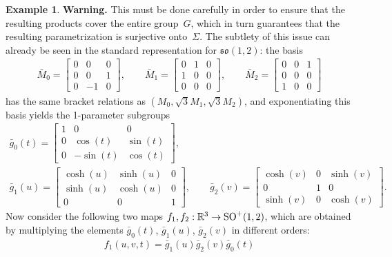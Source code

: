\documentclass[10pt,a4paper]{amsart}
\numberwithin{equation}{section}
\theoremstyle{definition}
\newtheorem{exmpl}[teo]{Example}
\begin{document}
\begin{exmpl}
{\bf Warning.} This must be done carefully in order to ensure that the resulting products cover the entire group~$G$,
which in turn guarantees that the resulting parametrization is surjective onto~$\Sigma$.
The subtlety of this issue can already be seen in the standard representation for $\mathfrak{so}(1,2)$: the basis
\begin{gather*}
\bar{M}_0 =
\begin{bmatrix}
0 & 0 & 0
\\
0 & 0 & 1
\\
0 & -1 & 0
\end{bmatrix},
\qquad
\bar{M}_1 =
\begin{bmatrix}
0 & 1 & 0
\\
1 & 0 & 0
\\
0 & 0 & 0
\end{bmatrix},
\qquad
\bar{M}_2 =
\begin{bmatrix}
0 & 0 & 1
\\
0 & 0 & 0
\\
1 & 0 & 0
\end{bmatrix}
\end{gather*}
has the same bracket relations as $(M_0, \sqrt{3}M_1, \sqrt{3}M_2)$, and exponentiating this basis yields the
1-parameter subgroups
\begin{gather*}
\bar{g}_0(t) =
\begin{bmatrix}
1 & 0 & 0
\\
0 & \cos(t) & \sin(t)
\\
0 & -\sin(t) & \cos(t)
\end{bmatrix},
\\
\bar{g}_1(u) =
\begin{bmatrix}
\cosh (u) & \sinh (u) & 0
\\
\sinh (u) & \cosh (u) & 0
\\
0 & 0 & 1
\end{bmatrix},
\qquad
\bar{g}_2(v) =
\begin{bmatrix}
\cosh (v) & 0 & \sinh (v)
\\
0 & 1 & 0
\\
\sinh (v) & 0 & \cosh (v)
\end{bmatrix}.
\end{gather*}
Now consider the following two maps $f_1, f_2:\mathbb{R}^3 \to {\rm SO}^+(1,2)$, which are obtained by multiplying the
elements $\bar{g}_0(t)$, $\bar{g}_1(u)$, $\bar{g}_2(v)$ in dif\/ferent orders:
\begin{gather*}
f_1(u,v,t) = \bar{g}_1(u) \bar{g}_2(v) \bar{g}_0(t)
\\

\end{gather*}
\end{exmpl}
\end{document}
